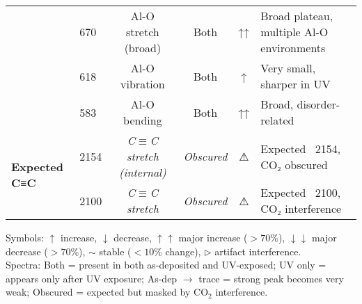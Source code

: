 \begin{table*}[ht]
\begin{tabular}{llcccl}
 & 670 & Al-O stretch (broad) & Both & ↑↑ & Broad plateau, multiple Al-O environments \\
 & 618 & Al-O vibration & Both & ↑ & Very small, sharper in UV \\
 & 583 & Al-O bending & Both & ↑↑ & Broad, disorder-related \\
\hline
\multirow{2}{*}{\textbf{Expected C≡C}} & 2154 & \textit{C$\equiv$C stretch (internal)} & \textit{Obscured} & ⚠ & Expected ~2154, CO₂ obscured \\
 & 2100 & \textit{C$\equiv$C stretch} & \textit{Obscured} & ⚠ & Expected ~2100, CO₂ interference \\
\hline
\end{tabular}
\begin{flushleft}
\footnotesize
Symbols: $\uparrow$ increase, $\downarrow$ decrease, $\uparrow\uparrow$ major increase ($>70\%$), $\downarrow\downarrow$ major decrease ($>70\%$), $\sim$ stable ($<10\%$ change), $\triangleright$ artifact interference. \\
Spectra: Both = present in both as-deposited and UV-exposed; UV only = appears only after UV exposure; As-dep $\rightarrow$ trace = strong peak becomes very weak; Obscured = expected but masked by CO$_2$ interference.
\end{flushleft}
\end{table*}
